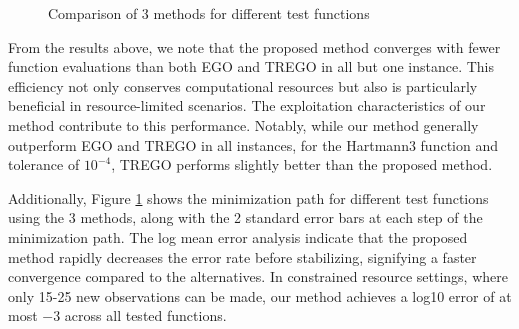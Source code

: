 \documentclass [PhD] {package/uclathes}
\begin{document}
\begin{figure}
    \qquad
    \caption{Comparison of 3 methods for different test functions}%
    \label{fig:functions}%
\end{figure}


From the results above, we note that the proposed method converges with fewer function evaluations than both EGO and TREGO in all but one instance. This efficiency not only conserves computational resources but also is particularly beneficial in resource-limited scenarios. The exploitation characteristics of our method contribute to this performance. Notably, while our method generally outperform EGO and TREGO in all instances, for the Hartmann3 function and tolerance of $10^{-4}$, TREGO performs slightly better than the proposed method. %

Additionally, Figure \ref{fig:functions} shows the minimization path for different test functions using the 3 methods, along with the 2 standard error bars at each step of the minimization path. The log mean error analysis indicate that the proposed method rapidly decreases the error rate before stabilizing, signifying a faster convergence compared to the alternatives. In constrained resource settings, where only 15-25 new observations can be made, our method achieves a log10 error of at most $-3$ across all tested functions.
\end{document}
